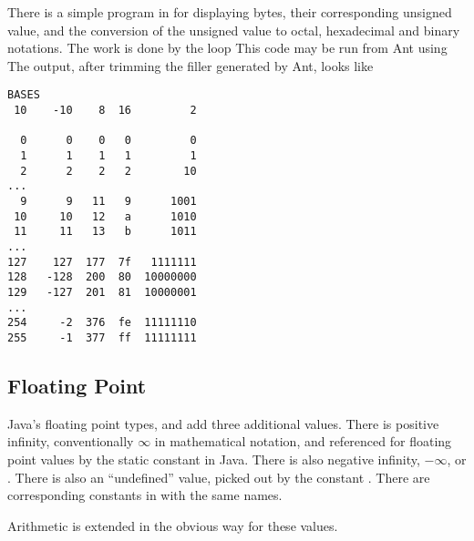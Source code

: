 There is a simple program in
%
%
for displaying bytes, their corresponding unsigned value, and the
conversion of the unsigned value to octal, hexadecimal and binary
notations.  The work is done by the loop
%
%
This code may be run from Ant using
%
%
%
The output, after trimming the filler generated by Ant, looks like
%
\begin{verbatim}
BASES
 10    -10    8  16         2

  0      0    0   0         0
  1      1    1   1         1
  2      2    2   2        10
...
  9      9   11   9      1001
 10     10   12   a      1010
 11     11   13   b      1011
...
127    127  177  7f   1111111
128   -128  200  80  10000000
129   -127  201  81  10000001
...
254     -2  376  fe  11111110
255     -1  377  ff  11111111
\end{verbatim}


\subsection{Floating Point}

Java's floating point types,  and  add three
additional values.  There is positive infinity, conventionally
$\infty$ in mathematical notation, and referenced for floating point
values by the static constant  in Java.
There is also negative infinity, $-\infty$, or
.  There is also an ``undefined'' value,
picked out by the constant .  There are corresponding
constants in  with the same names. 

Arithmetic is extended in the obvious way for these values.


